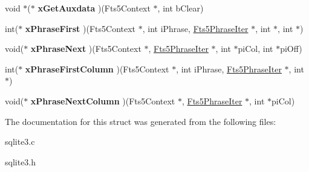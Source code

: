 \begin{DoxyCompactItemize}
\item 
void $\ast$($\ast$ {\bfseries x\+Get\+Auxdata} )(Fts5\+Context $\ast$, int b\+Clear)\hypertarget{structFts5ExtensionApi_ab18b1cb62e84590f50c0e007366165fb}{}\label{structFts5ExtensionApi_ab18b1cb62e84590f50c0e007366165fb}

\item 
int($\ast$ {\bfseries x\+Phrase\+First} )(Fts5\+Context $\ast$, int i\+Phrase, \hyperlink{structFts5PhraseIter}{Fts5\+Phrase\+Iter} $\ast$, int $\ast$, int $\ast$)\hypertarget{structFts5ExtensionApi_a0e7fb192d7ca28a5cc4f9ef025586761}{}\label{structFts5ExtensionApi_a0e7fb192d7ca28a5cc4f9ef025586761}

\item 
void($\ast$ {\bfseries x\+Phrase\+Next} )(Fts5\+Context $\ast$, \hyperlink{structFts5PhraseIter}{Fts5\+Phrase\+Iter} $\ast$, int $\ast$pi\+Col, int $\ast$pi\+Off)\hypertarget{structFts5ExtensionApi_a049c7163a39f20c675cf261fa181a9a1}{}\label{structFts5ExtensionApi_a049c7163a39f20c675cf261fa181a9a1}

\item 
int($\ast$ {\bfseries x\+Phrase\+First\+Column} )(Fts5\+Context $\ast$, int i\+Phrase, \hyperlink{structFts5PhraseIter}{Fts5\+Phrase\+Iter} $\ast$, int $\ast$)\hypertarget{structFts5ExtensionApi_ac1936193fd724dd4cac4772add9a724b}{}\label{structFts5ExtensionApi_ac1936193fd724dd4cac4772add9a724b}

\item 
void($\ast$ {\bfseries x\+Phrase\+Next\+Column} )(Fts5\+Context $\ast$, \hyperlink{structFts5PhraseIter}{Fts5\+Phrase\+Iter} $\ast$, int $\ast$pi\+Col)\hypertarget{structFts5ExtensionApi_aab6694c0e06fc2a5ecca0041a492f2b1}{}\label{structFts5ExtensionApi_aab6694c0e06fc2a5ecca0041a492f2b1}

\end{DoxyCompactItemize}


The documentation for this struct was generated from the following files\+:\begin{DoxyCompactItemize}
\item 
sqlite3.\+c\item 
sqlite3.\+h\end{DoxyCompactItemize}
